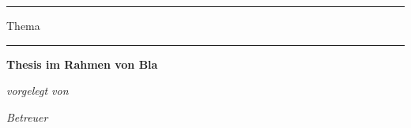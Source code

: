 
\begin{titlepage}
    \begin{center}
        \vspace*{0.8cm}
        
        {\color{gray} \rule[0.2em]{\linewidth}{1pt}}	
        \huge
        Thema
        {\color{gray} \rule[0.2em]{\linewidth}{1pt}}	
        
        \vspace{1cm}
        
        \large
        \textbf{Thesis im Rahmen von Bla}
        
        \vspace{2cm}
        
        \normalsize
        \textit{vorgelegt von}\vspace{0.2cm}
        
        \vspace{1.5cm}
       
        \textit{Betreuer}\vspace{0.2cm}
        
    \end{center}
\end{titlepage}
